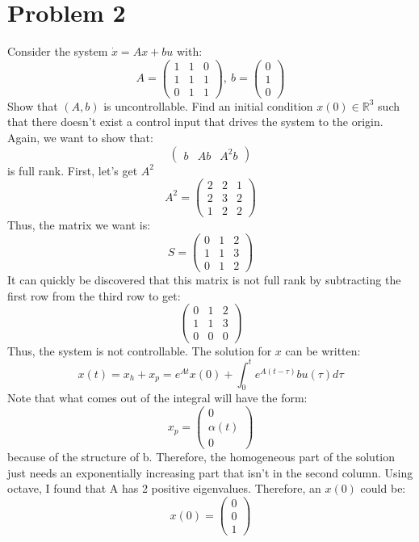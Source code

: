 \documentclass{article}
\begin{document}
\section*{Problem 2}
Consider the system $\dot{x}=Ax+bu$ with:
\[A=\begin{pmatrix}1&1&0\\1&1&1\\0&1&1\end{pmatrix},\ b=\begin{pmatrix}0\\1\\0\end{pmatrix}\]
Show that $(A,b)$ is uncontrollable. Find an initial condition $x(0)\in\mathbb{R}^3$ such that there doesn't exist a control input that drives the system to the origin.\\
Again, we want to show that:
\[\begin{pmatrix}b &Ab&A^2b\end{pmatrix}\]
is full rank. First, let's get $A^2$
\[A^2=\begin{pmatrix}2&2&1\\2&3&2\\1&2&2\end{pmatrix}\]
Thus, the matrix we want is:
\[S=\begin{pmatrix}0 & 1 & 2\\1 & 1 & 3\\0&1&2\end{pmatrix}\]
It can quickly be discovered that this matrix is not full rank by subtracting the first row from the third row to get:
\[\begin{pmatrix}0 & 1 & 2\\1 & 1 & 3\\0 & 0 & 0\end{pmatrix}\]
Thus, the system is not controllable. The solution for $x$ can be written:
\[x(t)=x_h+x_p=e^{At}x(0)+\int_0^te^{A(t-\tau)}bu(\tau)d\tau\]
Note that what comes out of the integral will have the form:
\[x_p=\begin{pmatrix}0\\\alpha(t)\\0\end{pmatrix}\]
because of the structure of b. Therefore, the homogeneous part of the solution just needs an exponentially increasing part that isn't in the second column. Using octave, I found that A has 2 positive eigenvalues. Therefore, an $x(0)$ could be:
\[x(0)=\begin{pmatrix}0\\0\\1\end{pmatrix}\]
\end{document}
